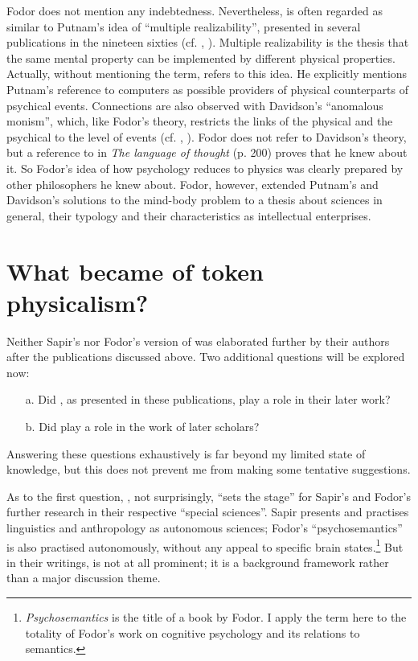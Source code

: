 \documentclass[output=paper]{langscibook}
\begin{document}
Fodor does not mention any indebtedness. Nevertheless,  is often regarded as similar to Putnam's idea of ``multiple realizability'', presented in several publications in the nineteen sixties (cf. \citealt{Putnam1960}, \citealt[xiii]{LoewerRey1991}). Multiple realizability is the thesis that the same mental property can be implemented by different physical properties. Actually, without mentioning the term, \citet[105--106]{Fodor1974} refers to this idea. He explicitly mentions Putnam's reference to computers as possible providers of physical counterparts of psychical events. Connections are also observed with Davidson's ``anomalous monism'', which, like Fodor's theory, restricts the links of the physical and the psychical to the level of events (cf. \citealt{Davidson1970}, \citealt[xxxi]{LoewerRey1991}). Fodor does not refer to Davidson's theory, but a reference to \citet{Davidson1970} in \emph{The language of thought} (p. 200) proves that he knew about it. So Fodor's idea of how psychology reduces to physics was clearly prepared by other philosophers he knew about. Fodor, however, extended Putnam's and Davidson's solutions to the mind-body problem to a thesis about sciences in general, their typology and their characteristics as intellectual enterprises.

\section{What became of token physicalism?}
\label{sec:elffers:whatbecame}

Neither Sapir's nor Fodor's version of  was elaborated further by their authors after the publications discussed above. Two additional questions will be explored now:

\begin{enumerate}
    \item[a.] Did , as presented in these publications, play a role in their later work?
    \item[b.] Did  play a role in the work of later scholars?
\end{enumerate}

Answering these questions exhaustively is far beyond my limited state of know\-ledge, but this does not prevent me from making some tentative suggestions.

As to the first question, , not surprisingly, ``sets the stage'' for Sapir's and Fodor's further research in their respective ``special sciences''. Sapir presents and practises linguistics and anthropology as autonomous sciences; Fodor's ``psychosemantics'' is also practised autonomously, without any appeal to specific brain states.\footnote{\emph{Psychosemantics} is the title of a \citeyear{Fodor1987} book by Fodor. I apply the term here to the totality of Fodor's work on cognitive psychology and its relations to semantics.} But in their writings,  is not at all prominent; it is a background framework rather than a major discussion theme.
\end{document}
